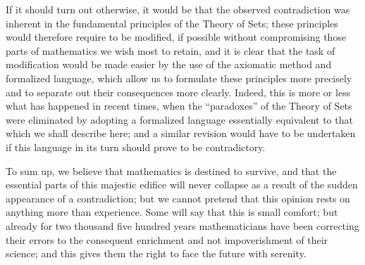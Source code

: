 If it should turn out otherwise, it would be that the observed contradiction was inherent in the fundamental principles of the Theory of Sets; these principles would therefore require to be modified, if possible without compromising those parts of mathematics we wish most to retain, and it is clear that the task of modification would be made easier by the use of the axiomatic method and formalized language, which allow us to formulate these principles more precisely and to separate out their consequences more clearly. Indeed, this is more or less what has happened in recent times, when the ``paradoxes'' of the Theory of Sets were eliminated by adopting a formalized language essentially equivalent to that which we shall describe here; and a similar revision would have to be undertaken if this language in its turn should prove to be contradictory.

To sum up, we believe that mathematics is destined to survive, and that the essential parts of this majestic edifice will never collapse as a result of the sudden appearance of a contradiction; but we cannot pretend that this opinion rests on anything more than experience. Some will say that this is small comfort; but already for two thousand five hundred years mathematicians have been correcting their errors to the consequent enrichment and not impoverishment of their science; and this gives them the right to face the future with serenity.
